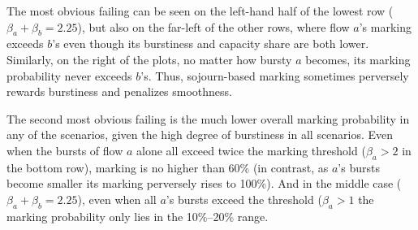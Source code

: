The most obvious failing can be seen on the left-hand half of the lowest row (\(\beta_a+\beta_b=2.25\)), but also on the far-left of the other rows, where flow \(a\)'s marking exceeds \(b\)'s even though its burstiness and capacity share are both lower.
Similarly, on the right of the plots, no matter how bursty \(a\) becomes, its marking probability never exceeds \(b\)'s. Thus, sojourn-based marking sometimes perversely rewards burstiness and penalizes smoothness.

The second most obvious failing is the much lower overall marking probability in any of the scenarios, given the high degree of burstiness in all scenarios. Even when the bursts of flow \(a\) alone all exceed twice the marking threshold (\(\beta_a>2\) in the bottom row), marking is no higher than 60\% (in contrast, as  \(a\)'s bursts become smaller its marking perversely rises to 100\%). And in the middle case (\(\beta_a+\beta_b=2.25\)), even when all \(a\)'s bursts exceed the threshold (\(\beta_a>1\) the marking probability only lies in the 10\%--20\% range.

